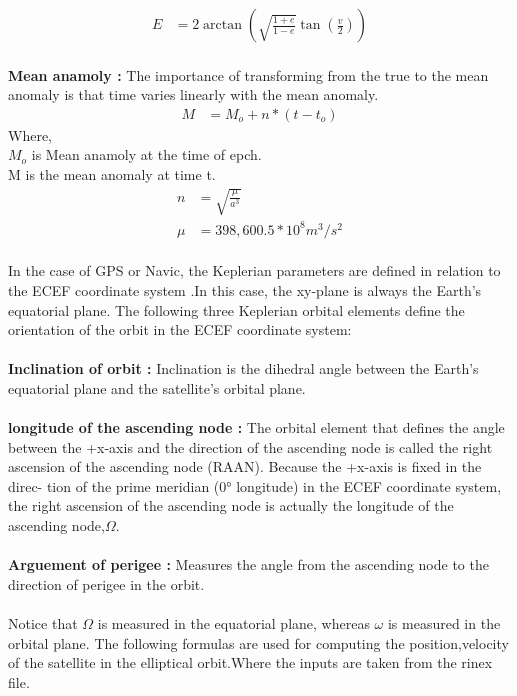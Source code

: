  \begin{align}
E&=2\arctan (\sqrt{\frac{1+e}{1-e}}\tan(\frac{v}{2})  )
 \end{align}
 \\
 \textbf{Mean anamoly :} The importance of transforming from the true to the mean
 anomaly is that time varies linearly with the mean anomaly.\\
 \begin{align}
  M&=M_o+n*(t-t_o)
 \end{align}
 Where,\\
 $M_o$ is Mean anamoly at the time of epch.\\
 M is the mean anomaly at time t.\\
 \begin{align}
  n&=\sqrt{\frac{\mu }{a^3}} \\
  \mu&=398,600.5 * 10^8 m^3/s^2
 \end{align} 
 \\
 In the case of GPS or Navic, the Keplerian
parameters are defined in relation to the ECEF coordinate system .In this case, the xy-plane is always the Earth's equatorial plane.
The following three Keplerian orbital elements define the orientation of the orbit in the
ECEF coordinate system:\\
\\
\textbf{Inclination of orbit :} Inclination is the dihedral angle between the Earth’s equatorial plane and the
satellite’s orbital plane.\\
\\
\textbf{longitude of the ascending node :} The orbital element that defines the
angle between the +x-axis and the direction of the ascending node is called the right
ascension of the ascending node (RAAN). Because the +x-axis is fixed in the direc-
tion of the prime meridian (0° longitude) in the ECEF coordinate system, the right
ascension of the ascending node is actually the longitude of the ascending node,$\Omega$.\\
\\
\textbf{Arguement of perigee :} Measures the angle
from the ascending node to the direction of perigee in the orbit. \\
\\
Notice that $\Omega$ is measured in the equatorial plane, whereas $\omega$ is measured in the orbital plane.
The following formulas are used for computing the position,velocity of the satellite in the elliptical orbit.Where the inputs are taken from the rinex file.
